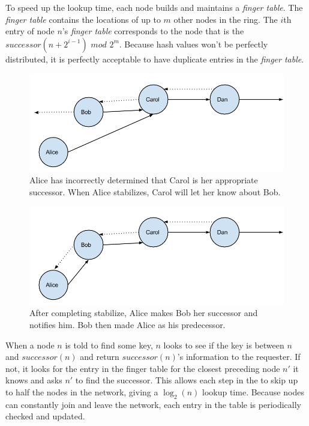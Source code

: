 \documentclass[conference, compsocconf, letterpaper]{IEEEtran}
\begin{document}
To speed up the lookup time, each node builds and maintains a \emph{finger table}.  The \emph{finger table} contains the locations of up to $m$ other nodes in the ring.  The $i$th entry of node $n$'s \emph{finger table} corresponds to the node that is the $successor(n+2^{i-1})$ $mod$ $2^m$. Because hash values won't be perfectly distributed, it is perfectly acceptable to have duplicate entries in the \emph{finger table}. 


\begin{figure}
    \includegraphics[width=\linewidth]{abcd1}
    \caption{Alice has incorrectly determined that Carol is her appropriate successor.  When Alice stabilizes, Carol will let her know about Bob.}
    \label{abcd1}
\end{figure}


\begin{figure}
    \includegraphics[width=\linewidth]{abcd2}
    \caption{After completing stabilize, Alice makes Bob her successor and notifies him. Bob then made Alice as his predecessor.}
    \label{abcd2}
\end{figure}



When a node $n$ is told to find some key, $n$ looks to see if the key is between $n$ and $successor(n)$ and return $successor(n)$'s information to the requester. If not, it looks for the entry in the finger table for the closest preceding node $n'$ it knows and asks $n'$ to find the successor.  This allows each step in the to skip up to half the nodes in the network, giving a $\log_2(n)$ lookup time.  Because nodes can constantly join and leave the network, each entry in the table is periodically checked and updated. 
\end{document}

